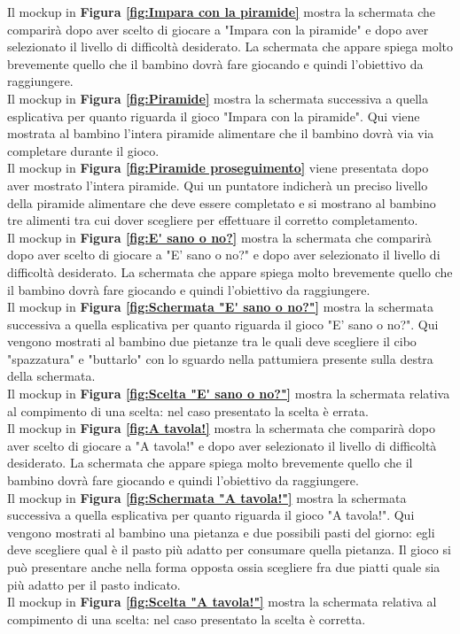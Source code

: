 Il mockup in \textbf{Figura \ref{fig:Impara con la piramide}} mostra la schermata che comparirà dopo aver scelto di giocare a "Impara con la piramide" e dopo aver selezionato il livello di difficoltà desiderato. La schermata che appare spiega molto brevemente quello che il bambino dovrà fare giocando e quindi l'obiettivo da raggiungere.\\
Il mockup in \textbf{Figura \ref{fig:Piramide}} mostra la schermata successiva a quella esplicativa per quanto riguarda il gioco "Impara con la piramide". Qui viene mostrata al bambino l'intera piramide alimentare che il bambino dovrà via via completare durante il gioco.\\
Il mockup in \textbf{Figura \ref{fig:Piramide proseguimento}} viene presentata dopo aver mostrato l'intera piramide. Qui un puntatore indicherà un preciso livello della piramide alimentare che deve essere completato e si mostrano al bambino tre alimenti tra cui dover scegliere per effettuare il corretto completamento.\\
Il mockup in \textbf{Figura \ref{fig:E' sano o no?}} mostra la schermata che comparirà dopo aver scelto di giocare a "E' sano o no?" e dopo aver selezionato il livello di difficoltà desiderato. La schermata che appare spiega molto brevemente quello che il bambino dovrà fare giocando e quindi l'obiettivo da raggiungere.\\
Il mockup in \textbf{Figura \ref{fig:Schermata "E' sano o no?"}} mostra la schermata successiva a quella esplicativa per quanto riguarda il gioco "E' sano o no?". Qui vengono mostrati al bambino due pietanze tra le quali deve scegliere il cibo "spazzatura" e "buttarlo" con lo sguardo nella pattumiera presente sulla destra della schermata.\\
Il mockup in \textbf{Figura \ref{fig:Scelta "E' sano o no?"}} mostra la schermata relativa al compimento di una scelta: nel caso presentato la scelta è errata.\\
Il mockup in \textbf{Figura \ref{fig:A tavola!}} mostra la schermata che comparirà dopo aver scelto di giocare a "A tavola!" e dopo aver selezionato il livello di difficoltà desiderato. La schermata che appare spiega molto brevemente quello che il bambino dovrà fare giocando e quindi l'obiettivo da raggiungere.\\
Il mockup in \textbf{Figura \ref{fig:Schermata "A tavola!"}} mostra la schermata successiva a quella esplicativa per quanto riguarda il gioco "A tavola!". Qui vengono mostrati al bambino una pietanza e due possibili pasti del giorno: egli deve scegliere qual è il pasto più adatto per consumare quella pietanza. Il gioco si può presentare anche nella forma opposta ossia scegliere fra due piatti quale sia più adatto per il pasto indicato.\\
Il mockup in \textbf{Figura \ref{fig:Scelta "A tavola!"}} mostra la schermata relativa al compimento di una scelta: nel caso presentato la scelta è corretta.

